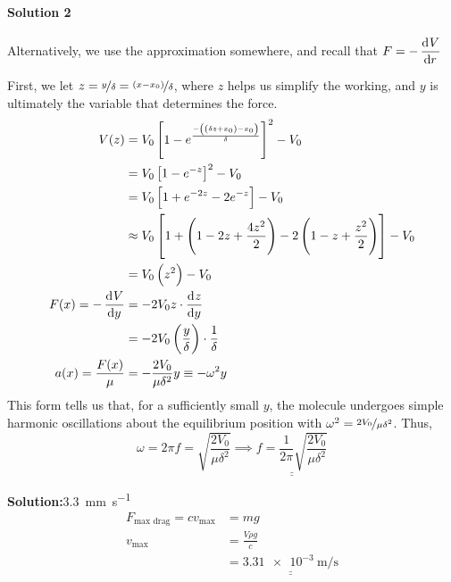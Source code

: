 \documentclass[11pt]{article}
\newcommand*\circled[1]{\tikz[baseline=(char.base)]{
		\node[shape=circle,draw,inner sep=2pt] (char) {#1};}}
\def\doubleunderline#1{\underline{\underline{#1}}}
\newcommand{\solution}[2]{\textbf{Solution:\hspace{1em}\circled{#1}}\hspace{1em}#2\hspace{1em}}
\begin{document}
\begin{enumerate}[label={[Q\arabic*]},itemsep={1em}]
			\paragraph{Solution 2} {\small Alternatively, we use the approximation somewhere, and recall that $F=-\dod{V}{r}$}
			
			First, we let $z = \nicefrac{y}{\delta} = \nicefrac{\left(x-x_0\right)}{\delta}$, where $z$ helps us simplify the working, and $y$ is ultimately the variable that determines the force. 
			\begin{align*}
				V(z) &= V_0\left[1-e^{\frac{-\left(\left(\delta z + x_0\right)-x_0\right)}{\delta}}\right]^2-V_0 \\
				&= V_0\left[1-e^{-z}\right]^2-V_0 \\
				&= V_0\left[1+e^{-2z}-2e^{-z}\right]-V_0 \\
				&\approx V_0\left[1+\left(1-2z+\frac{4z^2}{2}\right)-2\left(1-z+\frac{z^2}{2}\right)\right]-V_0\\
				&=V_0\left(z^2\right)-V_0\\
				F(x) =-\dod{V}{y}&=-2V_0z\cdot \dod{z}{y} \\
				&= -2V_0\left(\frac{y}{\delta}\right)\cdot \frac{1}{\delta} \\
				a(x) = \frac{F(x)}{\mu} &= -\frac{2V_0}{\mu\delta^2}y \equiv -\omega^2y
			\end{align*}
			This form tells us that, for a sufficiently small $y$, the molecule undergoes simple harmonic oscillations about the equilibrium position with $\omega^2 = \nicefrac{2V_0}{\mu\delta^2}$. Thus,
			\begin{equation}
				\omega = 2\pi\! f = \sqrt{\frac{2V_0}{\mu\delta^2}} \implies \doubleunderline{f = \frac{1}{2\pi}\sqrt{\frac{2V_0}{\mu\delta^2}}}
			\end{equation}
		
		\item \solution{B}{\SI{3.3}{\milli\meter\per\second}}
			\begin{align*}
				F_\text{max drag} = cv_\text{max} &= mg \\
				v_\text{max} &= \frac{V\!\rho g}{c} \\
				&= \doubleunderline{\SI{3.31e-3}{\meter\per\second}}
			\end{align*}
		

\end{enumerate}
\end{document}
